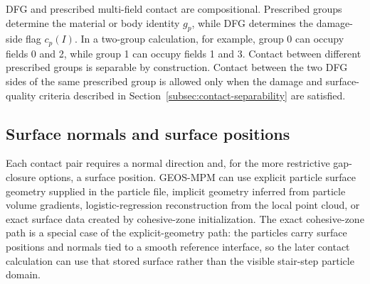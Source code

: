 DFG and prescribed multi-field contact are compositional.  Prescribed groups determine the material or body identity $g_p$, while DFG determines the damage-side flag $c_p(I)$.  In a two-group calculation, for example, group 0 can occupy fields 0 and 2, while group 1 can occupy fields 1 and 3.  Contact between different prescribed groups is separable by construction.  Contact between the two DFG sides of the same prescribed group is allowed only when the damage and surface-quality criteria described in Section~\ref{subsec:contact-separability} are satisfied.

\subsection{Surface normals and surface positions}
\label{subsec:contact-surface-geometry}

Each contact pair requires a normal direction and, for the more restrictive gap-closure options, a surface position.  GEOS-MPM can use explicit particle surface geometry supplied in the particle file, implicit geometry inferred from particle volume gradients, logistic-regression reconstruction from the local point cloud, or exact surface data created by cohesive-zone initialization.   The exact cohesive-zone path is a special case of the explicit-geometry path: the particles carry surface positions and normals tied to a smooth reference interface, so the later contact calculation can use that stored surface rather than the visible stair-step particle domain.

